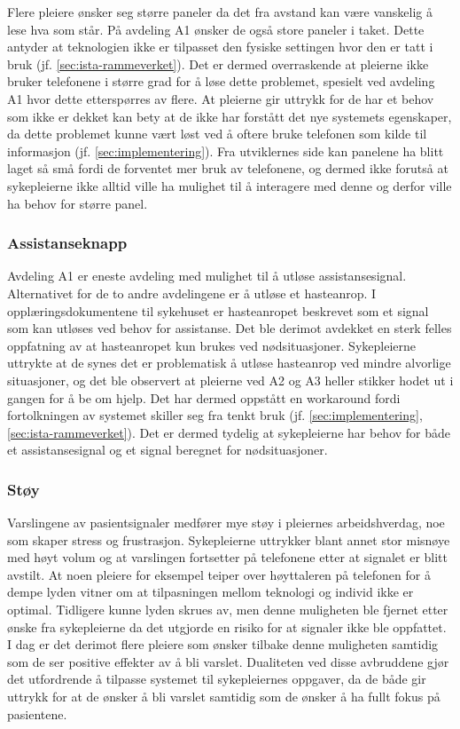 \noindent
Flere pleiere ønsker seg større paneler da det fra avstand kan være vanskelig å lese hva som står. På avdeling A1 ønsker de også store paneler i taket. Dette antyder at teknologien ikke er tilpasset den fysiske settingen hvor den er tatt i bruk (jf. \ref{sec:ista-rammeverket}). Det er dermed overraskende at pleierne ikke bruker telefonene i større grad for å løse dette problemet, spesielt ved avdeling A1 hvor dette etterspørres av flere. At pleierne gir uttrykk for de har et behov som ikke er dekket kan bety at de ikke har forstått det nye systemets egenskaper, da dette problemet kunne vært løst ved å oftere bruke telefonen som kilde til informasjon (jf. \ref{sec:implementering}). Fra utviklernes side kan panelene ha blitt laget så små fordi de forventet mer bruk av telefonene, og dermed ikke forutså at sykepleierne ikke alltid ville ha mulighet til å interagere med denne og derfor ville ha behov for større panel. 

\subsubsection{Assistanseknapp}
Avdeling A1 er eneste avdeling med mulighet til å utløse assistansesignal. Alternativet for de to andre avdelingene er å utløse et hasteanrop. I opplæringsdokumentene til sykehuset er hasteanropet beskrevet som et signal som kan utløses ved behov for assistanse. Det ble derimot avdekket en sterk felles oppfatning av at hasteanropet kun brukes ved nødsituasjoner. Sykepleierne uttrykte at de synes det er problematisk å utløse hasteanrop ved mindre alvorlige situasjoner, og det ble observert at pleierne ved A2 og A3 heller stikker hodet ut i gangen for å be om hjelp. Det har dermed oppstått en workaround fordi fortolkningen av systemet skiller seg fra tenkt bruk (jf. \ref{sec:implementering}, \ref{sec:ista-rammeverket}). Det er dermed tydelig at sykepleierne har behov for både et assistansesignal og et signal beregnet for nødsituasjoner.
  
\subsubsection{Støy}
Varslingene av pasientsignaler medfører mye støy i pleiernes arbeidshverdag, noe som skaper stress og frustrasjon. Sykepleierne uttrykker blant annet stor misnøye med høyt volum og at varslingen fortsetter på telefonene etter at signalet er blitt avstilt. At noen pleiere for eksempel teiper over høyttaleren på telefonen for å dempe lyden vitner om at tilpasningen mellom teknologi og individ ikke er optimal. Tidligere kunne lyden skrues av, men denne muligheten ble fjernet etter ønske fra sykepleierne da det utgjorde en risiko for at signaler ikke ble oppfattet. I dag er det derimot flere pleiere som ønsker tilbake denne muligheten samtidig som de ser positive effekter av å bli varslet. Dualiteten ved disse avbruddene gjør det utfordrende å tilpasse systemet til sykepleiernes oppgaver, da de både gir uttrykk for at de ønsker å bli varslet samtidig som de ønsker å ha fullt fokus på pasientene. 

